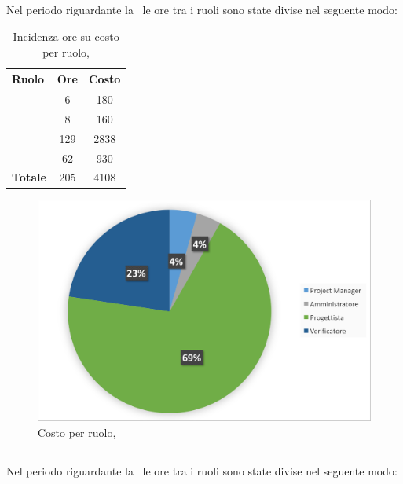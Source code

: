 \newpage
\subsection{\PA}
Nel periodo riguardante la \PA\ le ore tra i ruoli sono state divise nel seguente modo:

\begin{table}[h]
	\begin{center}
		\begin{tabular}{|l|c|c|}
			\hline
			\textbf{Ruolo}	& \textbf{Ore} &	\textbf{Costo}	 \\
			\hline
			\textit{\Pm}	&	6	&	180		\\
			\hline
			\textit{\Am}	&	8	&	160		\\
			\hline
			\textit{\Prog}	&	129	&	2838	\\
			\hline
			\textit{\Ver}	&	62	&	930	\\
			\hline
			\textbf{Totale}	&	205	&	4108	\\
			\hline
		\end{tabular}
	\end{center}
	\caption{Incidenza ore su costo per ruolo, \PA}
\end{table}

\begin{figure}[H]
	\centering 
	\includegraphics[scale=0.7]{Immagini/GraficiTorteSezione6/PA.png}
	\caption{Costo per ruolo, \PA}
\end{figure}

\newpage
\subsection{\PD}
Nel periodo riguardante la \PD\ le ore tra i ruoli sono state divise nel seguente modo:


